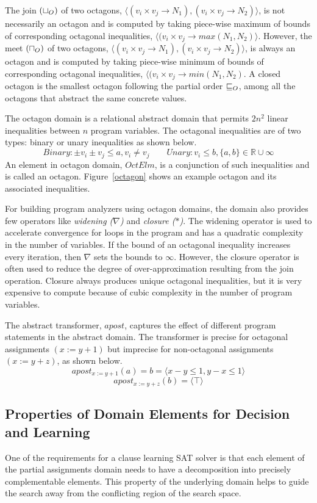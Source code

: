 The join $(\sqcup_{O})$ of two octagons, $\langle (v_i \times v_j \rightarrow N_1),
(v_i \times v_j \rightarrow N_2) \rangle$, is not necessarily an octagon 
and is computed by taking piece-wise maximum of bounds of corresponding 
octagonal inequalities, $\langle (v_i \times v_j \rightarrow max(N_1, N_2) \rangle$.
However, the meet $(\sqcap_{O})$ of two octagons, $\langle (v_i \times v_j \rightarrow N_1),
(v_i \times v_j \rightarrow N_2) \rangle$, is always an octagon and is 
computed by taking piece-wise minimum of bounds of corresponding 
octagonal inequalities, $\langle (v_i \times v_j \rightarrow min(N_1, N_2)$.  A closed 
octagon is the smallest octagon following the partial order $\sqsubseteq_{O}$, among all 
the octagons that abstract the same concrete values.

The octagon domain is a relational abstract domain that permits $2n^2$ 
linear inequalities between $n$ program variables.  The octagonal 
inequalities are of two types: binary or unary inequalities as shown below.
\[Binary: \pm v_i \pm v_j \leq a, v_i \neq v_j \qquad Unary: v_i \leq b, \{a, b\} \in \mathbb{R} \cup \infty \]  
An element in octagon domain, $OctElm$, is a conjunction of such 
inequalities and is called an octagon.  Figure~\ref{octagon} shows an 
example octagon and its associated inequalities.   

For building program analyzers using octagon domains, the domain also 
provides few operators like {\em widening ($\nabla$)} and {\em closure ($*$)}.  
The widening operator is used to accelerate convergence for loops in the program
and has a quadratic complexity in the number of variables.  If the bound of an 
octagonal inequality increases every iteration, then $\nabla$ sets the bounds 
to $\infty$.  However, the closure operator is often used to reduce the degree 
of over-approximation resulting from the join operation. Closure always produces 
unique octagonal inequalities, but it is very expensive to compute because of 
cubic complexity in the number of program variables.  
 
The abstract transformer, $apost$, captures the effect of different program 
statements in the abstract domain. The transformer is precise for octagonal 
assignments $(x:=y+1)$ but imprecise for non-octagonal assignments $(x:=y+z)$, 
as shown below.
\[apost_{x:=y+1}(a) = b = \langle x-y \leq 1, y-x \leq 1 \rangle \]  
\[apost_{x:=y+z}(b) = \langle \top \rangle \]  

\subsection{Properties of Domain Elements for Decision and Learning}
One of the requirements for a clause learning SAT solver 
is that each element of the partial assignments domain 
needs to have a decomposition into precisely complementable 
elements.  This property of the underlying domain helps to 
guide the search away from the conflicting region of the 
search space.

